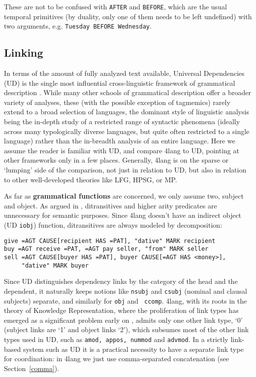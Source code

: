\documentclass[11pt,bookmarks,bookmarksnumbered,naturalnames,plainpages=false,pdftex,colorlinks=true,urlcolor=blue,bookmarksdepth=subsection,plainpages=false]{paper}
\begin{document}
\noindent
These are not to be confused with {\tt AFTER} and {\tt BEFORE}, which are the
usual temporal primitives (by duality, only one of them needs to be left
undefined) with two arguments, e.g. {\tt Tuesday BEFORE Wednesday}. 


\subsection{Linking}\label{linking}

In terms of the amount of fully analyzed text available, Universal
Dependencies (UD) is the single most influential cross-linguistic framework of
grammatical description \citep{Nivre:2018s}. While many other schools of
grammatical description offer a broader variety of analyses, these (with the
possible exception of tagmemics) rarely extend to a broad selection of
languages, the dominant style of linguistic analysis being the in-depth study
of a restricted range of syntactic phenomena (ideally across many
typologically diverse languages, but quite often restricted to a single
language) rather than the in-breadth analysis of an entire language. Here we
assume the reader is familiar with UD, and compare 4lang to UD, pointing at
other frameworks only in a few places. Generally, 4lang is on the sparse or
`lumping' side of the comparison, not just in relation to UD, but also in
relation to other well-developed theories like LFG, HPSG, or MP.

As far as {\bf grammatical functions} are concerned, we only assume two,
subject and object. As argued in \citep{Kornai:2012}, ditransitives and higher
arity predicates are unnecessary for semantic purposes. Since 4lang doesn't
have an indirect object (UD {\tt iobj}) function, ditransitives are always
modeled by decomposition:

\begin{verbatim}
give =AGT CAUSE[recipient HAS =PAT], "dative" MARK recipient
buy =AGT receive =PAT, =AGT pay seller, "from" MARK seller
sell =AGT CAUSE[buyer HAS =PAT], buyer CAUSE[=AGT HAS <money>], 
     "dative" MARK buyer
\end{verbatim}

\noindent
Since UD distinguishes dependency links by the category of the head and the
dependent, it naturally keeps notions like {\tt nsubj} and {\tt csubj}
(nominal and clausal subjects) separate, and similarly for {\tt obj} and {\tt
  ccomp}. 4lang, with its roots in the theory of Knowledge Representation,
where the proliferation of link types has emerged as a significant problem
early on \citep{Woods:1975}, admits only one other link type, `0' (subject
links are `1' and object links `2'), which subsumes most of the other link
types used in UD, such as {\tt amod, appos, nummod} and {\tt advmod}.  In a
strictly link-based system such as UD it is a practical necessity to have a
separate link type for coordination: in 4lang we just use comma-separated
concatenation (see Section~\ref{comma}). 
\end{document}
